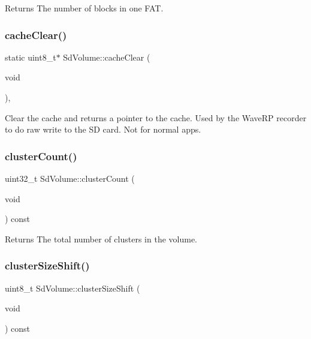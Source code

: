 \begin{DoxyReturn}{Returns}
The number of blocks in one F\+AT. 
\end{DoxyReturn}
\mbox{\label{class_sd_volume_aaf5b7f148ad45424bf6d20af4f082a13}} 
\subsubsection{\texorpdfstring{cache\+Clear()}{cacheClear()}}
{\footnotesize\ttfamily static uint8\+\_\+t$\ast$ Sd\+Volume\+::cache\+Clear (\begin{DoxyParamCaption}\item[{void}]{ }\end{DoxyParamCaption})\hspace{0.3cm}{\ttfamily [inline]}, {\ttfamily [static]}}

Clear the cache and returns a pointer to the cache. Used by the Wave\+RP recorder to do raw write to the SD card. Not for normal apps. \mbox{\label{class_sd_volume_a9d70b14b7bd7cb07d4c90e854283aed9}} 
\subsubsection{\texorpdfstring{cluster\+Count()}{clusterCount()}}
{\footnotesize\ttfamily uint32\+\_\+t Sd\+Volume\+::cluster\+Count (\begin{DoxyParamCaption}\item[{void}]{ }\end{DoxyParamCaption}) const\hspace{0.3cm}{\ttfamily [inline]}}

\begin{DoxyReturn}{Returns}
The total number of clusters in the volume. 
\end{DoxyReturn}
\mbox{\label{class_sd_volume_a7cdcb6e4c187c96b1b536f9bc587c659}} 
\subsubsection{\texorpdfstring{cluster\+Size\+Shift()}{clusterSizeShift()}}
{\footnotesize\ttfamily uint8\+\_\+t Sd\+Volume\+::cluster\+Size\+Shift (\begin{DoxyParamCaption}\item[{void}]{ }\end{DoxyParamCaption}) const\hspace{0.3cm}{\ttfamily [inline]}}

